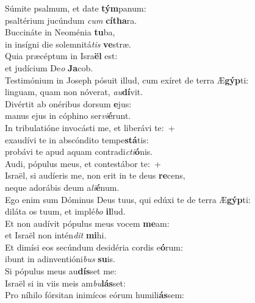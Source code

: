 \evenverse Súmite psalmum, et date \textbf{tým}panum:~\*\\
\evenverse psaltérium jucúndum \textit{cum} \textbf{cí}\textbf{tha}ra.\\
\oddverse Buccináte in Neoménia \textbf{tu}ba,~\*\\
\oddverse in insígni die solemnitá\textit{tis} \textbf{ve}stræ.\\
\evenverse Quia præcéptum in Isra\textbf{ël} est:~\*\\
\evenverse et judícium De\textit{o} \textbf{Ja}cob.\\
\oddverse Testimónium in Joseph pósuit illud, cum exíret de terra Æ\textbf{gýp}ti:~\*\\
\oddverse linguam, quam non nóverat, \textit{au}\textbf{dí}vit.\\
\evenverse Divértit ab onéribus dorsum \textbf{e}jus:~\*\\
\evenverse manus ejus in cóphino ser\textit{vi}\textbf{é}runt.\\
\oddverse In tribulatióne invocásti me, et liberávi te:~+\\
\oddverse  exaudívi te in abscóndito tempe\textbf{stá}tis:~\*\\
\oddverse probávi te apud aquam contradi\textit{cti}\textbf{ó}nis.\\
\evenverse Audi, pópulus meus, et contestábor te:~+\\
\evenverse  Israël, si audíeris me, non erit in te deus \textbf{re}cens,~\*\\
\evenverse neque adorábis deum a\textit{li}\textbf{é}num.\\
\oddverse Ego enim sum Dóminus Deus tuus, qui edúxi te de terra Æ\textbf{gýp}ti:~\*\\
\oddverse diláta os tuum, et implé\textit{bo} \textbf{il}lud.\\
\evenverse Et non audívit pópulus meus vocem \textbf{me}am:~\*\\
\evenverse et Israël non intén\textit{dit} \textbf{mi}hi.\\
\oddverse Et dimísi eos secúndum desidéria cordis e\textbf{ó}rum:~\*\\
\oddverse ibunt in adinventióni\textit{bus} \textbf{su}is.\\
\evenverse Si pópulus meus au\textbf{dís}set me:~\*\\
\evenverse Israël si in viis meis am\textit{bu}\textbf{lás}set:\\
\oddverse Pro níhilo fórsitan inimícos eórum humili\textbf{ás}sem:~\*\\
